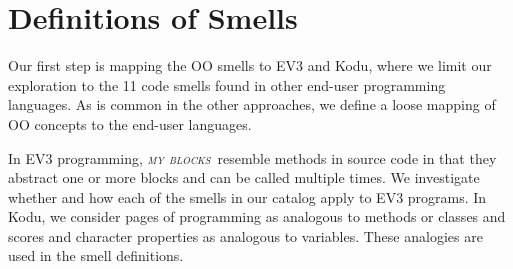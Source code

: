 \documentclass[conference]{IEEEtran}
\newcommand{\mbs}{\textsc{my blocks}}
\newcommand{\todo}[1]{\textbf{#1}}
\begin{document}



\section{Definitions of Smells}
\label{sec:definition}

Our first step is mapping the OO smells to EV3 and Kodu, where we limit our exploration to the 11 code smells found in other end-user programming languages. 
As is common in the other approaches, we define a loose mapping of OO concepts to the end-user languages. 

In EV3 programming, \emph{\mbs~}resemble methods in source code in that they abstract one or more  blocks and can be called multiple times. We investigate whether and how each of the smells in our catalog  apply to EV3 programs. In Kodu, we consider pages of programming as analogous to methods or classes and scores and character properties as analogous to variables. These analogies are used in the smell definitions.
\end{document}
